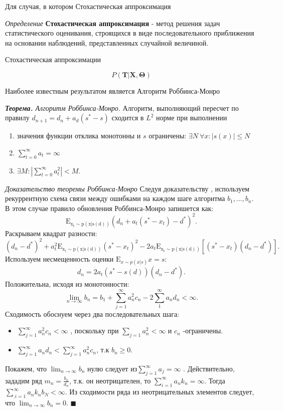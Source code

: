 Для случая, в котором 
Стохастическая аппроксимация 


\textit{Определение} \textbf{Стохастическая аппроксимация} - метод решения задач статистического оценивания,
 строящихся в виде последовательного приближения на основании наблюдений, представленных случайной величиной.

Стохастическая аппроксимации

$$
    P(\mathbf{T}| \mathbf{X},\mathbf{\Theta})
$$

Наиболее известным результатом является Алгоритм Роббинса-Монро

\textit{\textbf{Теорема.} Алгоритм Роббинса-Монро}. Алгоритм, выполняющий пересчет по правилу $d_{n+1} =d _n + a_d(s^*-s)$ сходится в $L^2$ норме при выполнении \begin{enumerate}
    \item значения функции отклика монотонны и $s$ ограничены: $\exists N\ \forall x : | s(x) | \le N$
    \item $\sum_{t=0}^\infty a_t = \infty$
    \item $\exists M : |\sum_{t=0}^\infty a_t^2 |< M$.
\end{enumerate}

\textit{Доказательство теоремы Роббинса-Монро} \label{monro}
Следуя доказательству \cite{blum1954approximation}, используем рекуррентную схема связи между ошибками на каждом шаге алгоритма $b_1,\dots,b_n$. 
В этом случае правило обновления Роббинса-Монро запишется как: 
\begin{equation}
    \mathrm{E_{x_t \sim p(x|s(d))}}(d_n+a_t(s^*-x_t) -d^*)^2.
\end{equation}
Раскрываем квадрат разности:
\begin{equation}
    (d_n - d^*)^2 + a_t^2 \mathrm{E_{x_t \sim p(x|s(d))}} (s^*-x_t)^2 - 2 a_t \mathrm{E_{x_t \sim p(x|s(d))}}\left[ (s^*-x_t)(d_n-d^*) \right].
\end{equation}
Используем несмещенность оценки $\mathrm{E}_{x \sim p(x|s)} x = s$:
\begin{equation}
    d_n =2 a_t (s^* -s(d))(d_n-d^*).
\end{equation}
Положительна, исходя из монотонности:
\begin{equation}
    \lim_{n \rightarrow \infty} b_n = b_1 + \sum_{j=1}^\infty a_n^2 c_n -2 \sum_1^{\infty} a_n d_n < \infty.
\end{equation}
Сходимость обоснуем через два последовательных шага: \begin{itemize}
    \item  $\sum_{j=1}^\infty a_n^2 c_n < \infty$ , поскольку при $\sum_{j=1} a_n^2 < \infty $ и $c_n$ -ограничены.
    \item $\sum_{j=1}^\infty a_n d_n < \sum_{j=1}^\infty a_n^2 c_n$,  т.к $b_n \ge 0$.
\end{itemize}
Покажем, что $\lim_{n \rightarrow \infty}{b_n}$  нулю следует из$\sum_{j=1}^\infty a_j  =\infty$ .
Действительно, зададим ряд $m_n = \frac{b_n}{d_n}$, т.к. он неотрицателен, то $\sum_{i=1}^{\infty} a_n k_n = \infty $. 
Тогда $\sum_{.i=1}^{\infty} a_n k_n b_N < \infty $. 
Из сходимости ряда из неотрицательных элементов следует, что $\lim_{n \rightarrow \infty}b_n =0$.
$\blacksquare$



